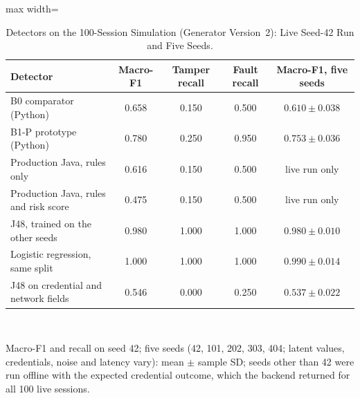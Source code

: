 \documentclass[manuscript,screen]{acmart}
\begin{document}
\begin{table}[htbp]
\centering
\small
\caption{Detectors on the 100-Session Simulation (Generator Version~2): Live Seed-42 Run and Five Seeds.}
\label{tab:b0_vs_b1}
\begin{adjustbox}{max width=\textwidth}
\begin{tabular}{l c c c c}
\toprule
Detector & Macro-F1 & Tamper recall & Fault recall & Macro-F1, five seeds \\
\midrule
B0 comparator (Python) & 0.658 & 0.150 & 0.500 & $0.610\pm0.038$ \\
B1-P prototype (Python) & 0.780 & 0.250 & 0.950 & $0.753\pm0.036$ \\
Production Java, rules only & 0.616 & 0.150 & 0.500 & live run only \\
Production Java, rules and risk score & 0.475 & 0.150 & 0.500 & live run only \\
J48, trained on the other seeds & 0.980 & 1.000 & 1.000 & $0.980\pm0.010$ \\
Logistic regression, same split & 1.000 & 1.000 & 1.000 & $0.990\pm0.014$ \\
J48 on credential and network fields & 0.546 & 0.000 & 0.250 & $0.537\pm0.022$ \\
\bottomrule
\end{tabular}
\end{adjustbox}
\\[2pt]
\parbox{0.92\linewidth}{\footnotesize Macro-F1 and recall on seed 42; five seeds (42, 101, 202, 303, 404; latent values, credentials, noise and latency vary): mean $\pm$ sample SD; seeds other than 42 were run offline with the expected credential outcome, which the backend returned for all 100 live sessions.}
\end{table}
\end{document}
